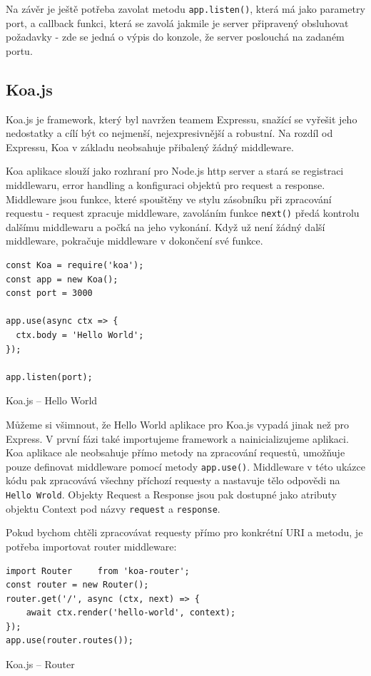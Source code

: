 \documentclass[thesis=M,czech]{FITthesis}[2019/12/23]
\begin{document}
Na závěr je ještě potřeba zavolat metodu \texttt{app.listen()}, která má jako parametry port, a callback funkci, která se zavolá jakmile je server připravený obsluhovat požadavky - zde se jedná o výpis do konzole, že server poslouchá na zadaném portu.

\subsection*{Koa.js}
Koa.js je framework, který byl navržen teamem Expressu, snažící se vyřešit jeho nedostatky a cílí být co nejmenší, nejexpresivnější a robustní. Na rozdíl od Expressu, Koa v základu neobsahuje přibalený žádný middleware.

Koa aplikace slouží jako rozhraní pro Node.js http server a stará se registraci middlewaru, error handling a konfiguraci objektů pro request a response.
Middleware jsou funkce, které spouštěny ve stylu zásobníku při zpracování requestu - request zpracuje middleware, zavoláním funkce \texttt{next()} předá kontrolu dalšímu middlewaru a počká na jeho vykonání. Když už není žádný další middleware, pokračuje middleware v dokončení své funkce.

\begin{listing}[H]
\begin{verbatim}
const Koa = require('koa');
const app = new Koa();
const port = 3000

app.use(async ctx => {
  ctx.body = 'Hello World';
});

app.listen(port);
\end{verbatim}
\caption{Koa.js -- Hello World}
\label{lst:koa_hello}
\end{listing}

Můžeme si všimnout, že Hello World aplikace pro Koa.js vypadá jinak než pro Express. V první fázi také importujeme framework a nainicializujeme aplikaci. Koa aplikace ale neobsahuje přímo metody na zpracování requestů, umožňuje pouze definovat middleware pomocí metody \texttt{app.use()}. Middleware v této ukázce kódu pak zpracovává všechny příchozí requesty a nastavuje tělo odpovědi na \texttt{Hello Wrold}. Objekty Request a Response jsou pak dostupné jako atributy objektu Context pod názvy \texttt{request} a \texttt{response}.

Pokud bychom chtěli zpracovávat requesty přímo pro konkrétní URI a metodu, je potřeba importovat router middleware:

\begin{listing}[H]
\begin{verbatim}
import Router     from 'koa-router';
const router = new Router();
router.get('/', async (ctx, next) => {
    await ctx.render('hello-world', context);
});
app.use(router.routes());
\end{verbatim}
\caption{Koa.js -- Router}
\label{lst:koa_router}
\end{listing}
\end{document}
